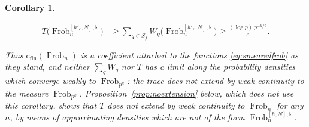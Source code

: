 \documentclass[11pt]{amsart}
\newtheorem{corollary}[theorem]{Corollary}
\theoremstyle{definition}
\newcommand{\Frob}{\operatorname{Frob}}
\newcommand{\cfin}{\mathrm{c}_{\mathrm{fin}}}
\begin{document}
\begin{corollary}
\begin{enumerate}
\begin{align*}
  T\bigl(\Frob_n^{[h'_\varepsilon,N],\flat}\bigr)
   &\ge\sum_{q\in S_f}W_q\bigl(\Frob_n^{[h'_\varepsilon,N],\flat}\bigr)
   \ge\frac{(\log p)\,p^{-k/2}}{\varepsilon}.
\end{align*}
\end{enumerate}
Thus $\cfin(\Frob_n)$ is a coefficient attached to the functions
\eqref{eq:smearedfrob} as they stand, and neither $\sum_qW_q$ nor $T$ has a
limit along the probability densities which converge weakly to
$\Frob_{p^k}$: the trace does not extend by weak continuity to the measure
$\Frob_{p^k}$. Proposition~\ref{prop:noextension} below, which does not use
this corollary, shows that $T$ does not extend by weak continuity to
$\Frob_n$ for any $n$, by means of approximating densities which are not of the form
$\Frob_n^{[h,N],\flat}$.
\end{corollary}
\end{document}
